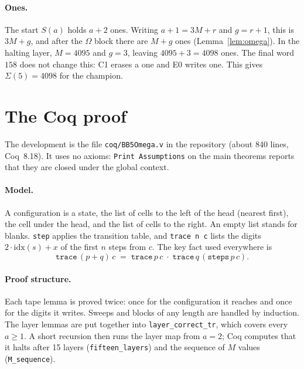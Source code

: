 \documentclass[11pt]{article}
\theoremstyle{definition}
\theoremstyle{remark}
\newcommand{\coq}[1]{\texttt{#1}}
\begin{document}
\paragraph{Ones.} The start $S(a)$ holds $a+2$ ones. Writing $a+1 = 3M+r$ and
$g = r+1$, this is $3M + g$, and after the $\Omega$ block there are $M+g$ ones
(Lemma~\ref{lem:omega}). In the halting layer, $M = 4095$ and $g = 3$, leaving
$4095+3 = 4098$ ones. The final word $158$ does not change this: C1 erases a one and
E0 writes one. This gives $\Sigma(5) = 4098$ for the champion.

\section{The Coq proof}\label{sec:coq}

The development is the file \coq{coq/BB5Omega.v} in the repository (about 840 lines,
Coq~8.18). It uses no axioms: \coq{Print Assumptions} on the main theorems reports
that they are closed under the global context.

\paragraph{Model.} A configuration is a state, the list of cells to the left of the
head (nearest first), the cell under the head, and the list of cells to the right. An
empty list stands for blanks. \coq{step} applies the transition table, and
\coq{trace n c} lists the digits $2\cdot\mathrm{idx}(s)+x$ of the first $n$ steps from
$c$. The key fact used everywhere is
\[
\coq{trace}\,(p+q)\,c \;=\; \coq{trace}\,p\,c \;\cdot\; \coq{trace}\,q\,(\coq{steps}\,p\,c).
\]

\paragraph{Proof structure.} Each tape lemma is proved twice: once for the
configuration it reaches and once for the digits it writes. Sweeps and blocks of any
length are handled by induction. The layer lemmas are put together into
\coq{layer\_correct\_tr}, which covers every $a\ge1$. A short recursion then runs the
layer map from $a=2$; Coq computes that it halts after 15 layers
(\coq{fifteen\_layers}) and the sequence of $M$ values (\coq{M\_sequence}).
\end{document}
